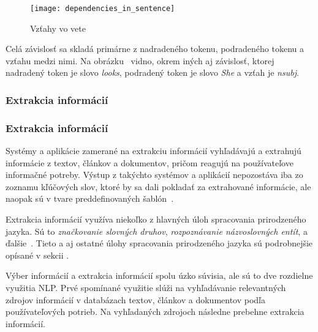 \begin{figure}[H]
\begin{center}\texttt{[image: dependencies\_in\_sentence]}\end{center}
\caption[Vzťahy vo vete]{Vzťahy vo vete}\label{fig:dependencies_in_sentence}
\end{figure}

Celá závislosť sa skladá primárne z nadradeného tokenu, podradeného tokenu a vzťahu medzi nimi. Na obrázku~ vidno, okrem iných aj závislosť, ktorej nadradený token je slovo \textit{looks}, podradený token je slovo \textit{She} a vzťah je \textit{nsubj}.

%
%
{
	\subsubsection{Extrakcia informácií}
}
{
	\subsubsection{Extrakcia informácií}
}
\label{subsubsec:information_extraction}
Systémy a aplikácie zamerané na extrakciu informácií vyhľadávajú a extrahujú informácie z textov, článkov a dokumentov, pričom reagujú na používateľove informačné potreby. Výstup z takýchto systémov a aplikácií nepozostáva iba zo zoznamu kľúčových slov, ktoré by sa dali pokladať za extrahované informácie, ale naopak sú v tvare preddefinovaných šablón~\cite{Preeti}.

Extrakcia informácií využíva niekoľko z hlavných úloh spracovania prirodzeného jazyka. Sú to \textit{značkovanie slovných druhov}, \textit{rozpoznávanie názvoslovných entít}, a ďalšie~\cite{Preeti}. Tieto a aj ostatné úlohy spracovania prirodzeného jazyka sú podrobnejšie opísané v sekcii .

Výber informácií a extrakcia informácií spolu úzko súvisia, ale sú to dve rozdielne využitia NLP. Prvé spomínané využitie slúži na vyhľadávanie relevantných zdrojov informácií v databázach textov, článkov a dokumentov podľa používateľových potrieb. Na vyhľadaných zdrojoch následne prebehne extrakcia informácií. 

